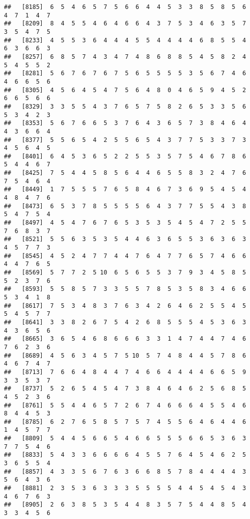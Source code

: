 \documentclass[
]{book}
\begin{document}
\begin{verbatim}
##   [8185]  6  5  4  6  5  7  5  6  6  4  4  5  3  3  8  5  8  5  6  4  7  1  4  7
##   [8209]  8  4  5  5  4  6  4  6  6  4  3  7  5  3  4  6  3  5  7  3  5  4  7  5
##   [8233]  4  5  5  3  6  4  4  4  5  5  4  4  4  4  6  8  5  5  4  6  3  6  6  3
##   [8257]  6  8  5  7  4  3  4  7  4  8  6  8  8  5  4  5  8  2  4  5  4  5  5  2
##   [8281]  5  6  7  6  7  6  7  5  6  5  5  5  5  3  5  6  7  4  6  4  6  6  5  6
##   [8305]  4  5  6  4  5  4  7  5  6  4  8  0  4  6  5  9  4  5  2  6  6  5  6  6
##   [8329]  3  3  5  5  4  3  7  6  5  7  5  8  2  6  5  3  3  5  6  5  3  4  2  3
##   [8353]  5  6  7  6  6  5  3  7  6  4  3  6  5  7  3  8  4  6  4  4  3  6  6  4
##   [8377]  5  5  6  5  4  2  5  5  6  5  4  3  7  7  5  3  3  7  3  4  5  6  4  5
##   [8401]  6  4  5  3  6  5  2  2  5  5  3  5  7  5  4  6  7  8  6  5  4  4  6  7
##   [8425]  7  5  4  4  5  8  5  6  4  4  6  5  5  8  3  2  4  7  6  7  5  4  6  4
##   [8449]  1  7  5  5  5  7  6  5  8  4  6  7  3  6  9  5  4  5  4  4  8  4  7  6
##   [8473]  6  5  3  7  8  5  5  5  5  6  4  3  7  7  5  5  4  3  8  5  4  7  5  4
##   [8497]  4  5  4  7  6  7  6  5  3  5  3  5  4  5  4  7  2  5  5  7  6  8  3  7
##   [8521]  5  5  6  3  5  3  5  4  4  6  3  6  5  5  3  6  3  6  3  4  5  7  7  3
##   [8545]  4  5  2  4  7  7  4  4  7  6  4  7  7  6  5  7  4  6  6  4  4  7  6  5
##   [8569]  5  7  7  2  5 10  6  5  6  5  5  3  7  9  3  4  5  8  5  5  2  3  7  6
##   [8593]  5  5  8  5  7  3  3  5  5  7  8  5  3  5  8  3  4  6  6  5  3  4  1  8
##   [8617]  7  5  3  4  8  3  7  6  3  4  2  6  4  6  2  5  5  4  5  5  4  5  7  7
##   [8641]  3  3  8  2  6  7  5  4  2  6  8  5  5  5  4  5  3  6  3  4  3  6  5  6
##   [8665]  3  6  5  4  6  8  6  6  6  3  3  1  4  7  4  4  7  4  6  7  6  2  3  6
##   [8689]  4  5  6  3  4  5  7  5 10  5  7  4  8  4  4  5  7  8  6  4  6  7  4  7
##   [8713]  7  6  6  4  8  4  4  7  4  6  6  4  4  4  4  6  6  5  9  3  3  5  3  7
##   [8737]  5  2  6  5  4  5  4  7  3  8  4  6  4  6  2  5  6  8  5  4  5  2  3  6
##   [8761]  5  5  4  4  6  5  7  2  6  7  4  6  6  6  4  5  5  4  6  8  4  4  5  3
##   [8785]  6  2  7  6  5  8  5  7  5  7  4  5  5  6  4  6  4  4  6  1  4  5  7  7
##   [8809]  5  4  4  5  6  6  5  4  6  6  5  5  5  6  6  5  3  6  3  7  7  5  4  6
##   [8833]  5  4  3  3  6  6  6  6  4  5  5  7  6  4  5  4  6  2  5  3  6  5  5  4
##   [8857]  4  3  3  5  6  7  6  3  6  6  8  5  7  8  4  4  4  4  3  5  6  4  3  6
##   [8881]  2  3  5  3  6  3  3  3  5  5  5  5  4  4  5  4  5  4  3  4  6  7  6  3
##   [8905]  2  6  3  8  5  3  5  4  4  8  3  5  7  5  4  4  8  5  4  3  3  4  5  6

\end{verbatim}
\end{document}

